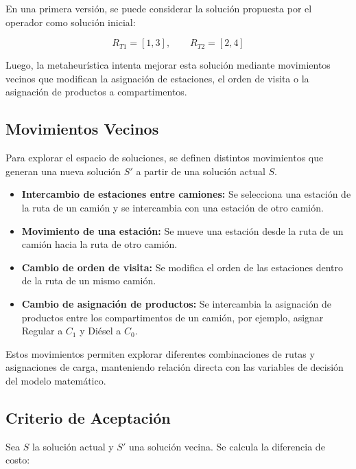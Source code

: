 En una primera versión, se puede considerar la solución propuesta por el operador como solución inicial:

\begin{equation*}
R_{T1} = [1,3], \qquad R_{T2} = [2,4]
\end{equation*}

Luego, la metaheurística intenta mejorar esta solución mediante movimientos vecinos que modifican la asignación de estaciones, el orden de visita o la asignación de productos a compartimentos.

\subsection{Movimientos Vecinos}

Para explorar el espacio de soluciones, se definen distintos movimientos que generan una nueva solución $S'$ a partir de una solución actual $S$.

\begin{itemize}
    \item \textbf{Intercambio de estaciones entre camiones:} Se selecciona una estación de la ruta de un camión y se intercambia con una estación de otro camión.
    
    \item \textbf{Movimiento de una estación:} Se mueve una estación desde la ruta de un camión hacia la ruta de otro camión.
    
    \item \textbf{Cambio de orden de visita:} Se modifica el orden de las estaciones dentro de la ruta de un mismo camión.
    
    \item \textbf{Cambio de asignación de productos:} Se intercambia la asignación de productos entre los compartimentos de un camión, por ejemplo, asignar Regular a $C_1$ y Diésel a $C_0$.
\end{itemize}

Estos movimientos permiten explorar diferentes combinaciones de rutas y asignaciones de carga, manteniendo relación directa con las variables de decisión del modelo matemático.

\subsection{Criterio de Aceptación}

Sea $S$ la solución actual y $S'$ una solución vecina. Se calcula la diferencia de costo:


